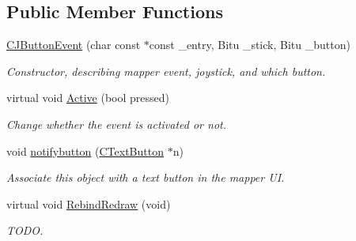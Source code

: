 \subsection*{Public Member Functions}
\begin{DoxyCompactItemize}
\item 
\hypertarget{classCJButtonEvent_a1e52758b5a23171097f00bae1acf028a}{\hyperlink{classCJButtonEvent_a1e52758b5a23171097f00bae1acf028a}{C\-J\-Button\-Event} (char const $\ast$const \-\_\-entry, Bitu \-\_\-stick, Bitu \-\_\-button)}\label{classCJButtonEvent_a1e52758b5a23171097f00bae1acf028a}

\begin{DoxyCompactList}\small\item\em Constructor, describing mapper event, joystick, and which button. \end{DoxyCompactList}\item 
\hypertarget{classCJButtonEvent_ad3be3de6af81cfbcf569e2d9bcee7e84}{virtual void \hyperlink{classCJButtonEvent_ad3be3de6af81cfbcf569e2d9bcee7e84}{Active} (bool pressed)}\label{classCJButtonEvent_ad3be3de6af81cfbcf569e2d9bcee7e84}

\begin{DoxyCompactList}\small\item\em Change whether the event is activated or not. \end{DoxyCompactList}\item 
\hypertarget{classCJButtonEvent_adc04a0aadec5744e0408c5e780d54d6b}{void \hyperlink{classCJButtonEvent_adc04a0aadec5744e0408c5e780d54d6b}{notifybutton} (\hyperlink{classCTextButton}{C\-Text\-Button} $\ast$n)}\label{classCJButtonEvent_adc04a0aadec5744e0408c5e780d54d6b}

\begin{DoxyCompactList}\small\item\em Associate this object with a text button in the mapper U\-I. \end{DoxyCompactList}\item 
\hypertarget{classCJButtonEvent_a4032dc1efa2b28c609a025a9cd407200}{virtual void \hyperlink{classCJButtonEvent_a4032dc1efa2b28c609a025a9cd407200}{Rebind\-Redraw} (void)}\label{classCJButtonEvent_a4032dc1efa2b28c609a025a9cd407200}

\begin{DoxyCompactList}\small\item\em T\-O\-D\-O. \end{DoxyCompactList}\end{DoxyCompactItemize}
